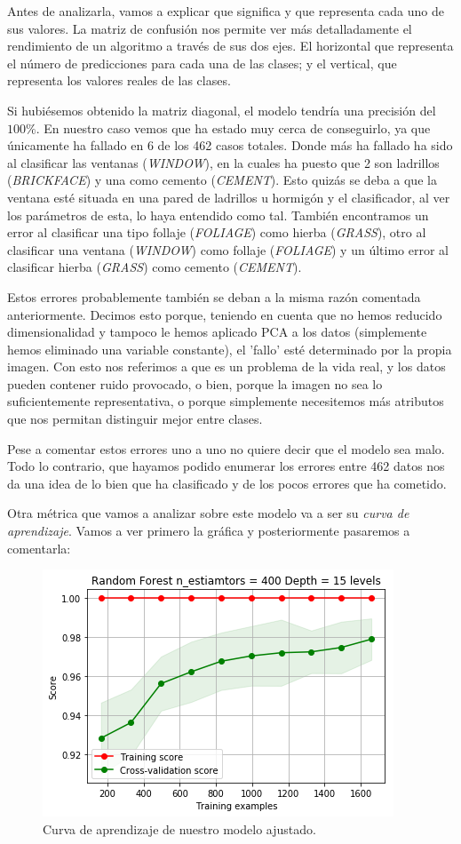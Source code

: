 \documentclass[11pt,a4paper]{article}
\begin{document}
Antes de analizarla, vamos a explicar que significa y que representa cada uno de sus valores. La matriz de confusión nos permite ver más
detalladamente el rendimiento de un algoritmo a través de sus dos ejes. El horizontal que representa el número de predicciones para cada
una de las clases; y el vertical, que representa los valores reales de las clases.

Si hubiésemos obtenido la matriz diagonal, el modelo tendría una precisión del $100\%$. En nuestro caso vemos que ha estado muy cerca de
conseguirlo, ya que únicamente ha fallado en 6 de los 462 casos totales. Donde más ha fallado ha sido al clasificar las ventanas
(\textit{WINDOW}), en la cuales ha puesto que 2 son ladrillos (\textit{BRICKFACE}) y una como cemento (\textit{CEMENT}). Esto quizás se
deba a que la ventana esté situada en una pared de ladrillos u hormigón y el clasificador, al ver los parámetros de esta, lo haya
entendido como tal. También encontramos un error al clasificar una tipo follaje (\textit{FOLIAGE}) como hierba (\textit{GRASS}), otro al
clasificar una ventana (\textit{WINDOW}) como follaje (\textit{FOLIAGE}) y un último error al clasificar hierba (\textit{GRASS}) como
cemento (\textit{CEMENT}).

Estos errores probablemente también se deban a la misma razón comentada anteriormente. Decimos esto porque, teniendo en cuenta que no
hemos reducido dimensionalidad y tampoco le hemos aplicado PCA a los datos (simplemente hemos eliminado una variable constante), el 'fallo' esté
determinado por la propia imagen. Con esto nos referimos a que es un problema de la vida real, y los datos pueden contener ruido
provocado, o bien, porque la imagen no sea lo suficientemente representativa, o porque simplemente necesitemos más atributos que nos
permitan distinguir mejor entre clases.

Pese a comentar estos errores uno a uno no quiere decir que el modelo sea malo. Todo lo contrario, que hayamos podido enumerar los errores
entre 462 datos nos da una idea de lo bien que ha clasificado y de los pocos errores que ha cometido.

Otra métrica que vamos a analizar sobre este modelo va a ser su \textit{curva de aprendizaje}. Vamos a ver primero la gráfica y
posteriormente pasaremos a comentarla:

\begin{figure}[H]
    \centering
    \includegraphics[scale=0.75]{img/lc-rf.png}
    \caption{Curva de aprendizaje de nuestro modelo ajustado.}
    \label{fig:lc-rf}
\end{figure}
\end{document}
